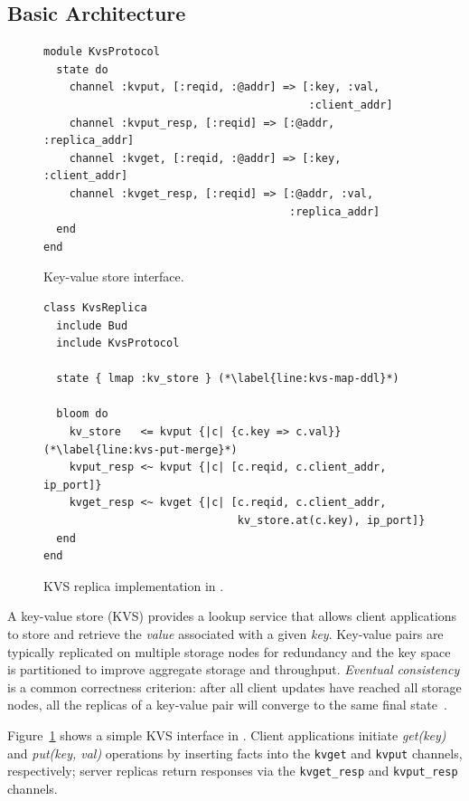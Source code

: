 \subsection{Basic Architecture}
\begin{figure}[t]
\begin{scriptsize}
\begin{lstlisting}
module KvsProtocol
  state do
    channel :kvput, [:reqid, :@addr] => [:key, :val,
                                         :client_addr]
    channel :kvput_resp, [:reqid] => [:@addr, :replica_addr]
    channel :kvget, [:reqid, :@addr] => [:key, :client_addr]
    channel :kvget_resp, [:reqid] => [:@addr, :val,
                                      :replica_addr]
  end
end
\end{lstlisting}
\end{scriptsize}
\caption{Key-value store interface.}
\label{fig:kvs-interface}
\end{figure}
\vspace{-4pt}
\begin{figure}[t]
\begin{scriptsize}
\begin{lstlisting}
class KvsReplica
  include Bud
  include KvsProtocol

  state { lmap :kv_store } (*\label{line:kvs-map-ddl}*)

  bloom do
    kv_store   <= kvput {|c| {c.key => c.val}} (*\label{line:kvs-put-merge}*)
    kvput_resp <~ kvput {|c| [c.reqid, c.client_addr, ip_port]}
    kvget_resp <~ kvget {|c| [c.reqid, c.client_addr,
                              kv_store.at(c.key), ip_port]}
  end
end
\end{lstlisting}
\end{scriptsize}
\caption{KVS replica implementation in \lang.}
\label{fig:kvs-replica}
\end{figure}

A key-value store (KVS) provides a lookup service that allows client
applications to store and retrieve the \emph{value} associated with a given
\emph{key}. Key-value pairs are typically replicated on multiple storage nodes
for redundancy and the key space is partitioned to improve aggregate storage and
throughput. \emph{Eventual consistency} is a common correctness criterion: after
all client updates have reached all storage nodes, all the replicas of a
key-value pair will converge to the same final state~\cite{Terry1995,vogels}.

Figure~\ref{fig:kvs-interface} shows a simple KVS interface in \lang. Client
applications initiate \emph{get(key)} and \emph{put(key, val)} operations by
inserting facts into the \texttt{kvget} and \texttt{kvput} channels,
respectively; server replicas return responses via the \texttt{kvget\_resp} and
\texttt{kvput\_resp} channels.

